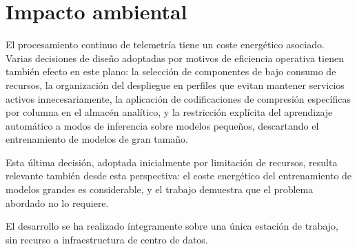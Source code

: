 \section{Impacto ambiental}

El procesamiento continuo de telemetría tiene un coste energético asociado. Varias decisiones
de diseño adoptadas por motivos de eficiencia operativa tienen también efecto en este plano:
la selección de componentes de bajo consumo de recursos, la organización del despliegue en
perfiles que evitan mantener servicios activos innecesariamente, la aplicación de
codificaciones de compresión específicas por columna en el almacén analítico, y la
restricción explícita del aprendizaje automático a modos de inferencia sobre modelos
pequeños, descartando el entrenamiento de modelos de gran tamaño.

Esta última decisión, adoptada inicialmente por limitación de recursos, resulta relevante
también desde esta perspectiva: el coste energético del entrenamiento de modelos grandes es
considerable, y el trabajo demuestra que el problema abordado no lo requiere.

El desarrollo se ha realizado íntegramente sobre una única estación de trabajo, sin recurso a
infraestructura de centro de datos.
